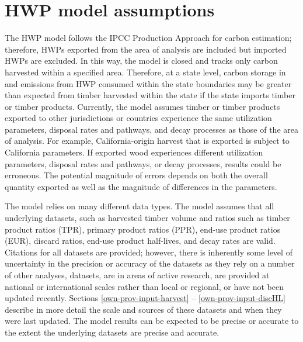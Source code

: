\documentclass[
  openany]{book}
\begin{document}
\hypertarget{int-assump}{%
\section{HWP model assumptions}\label{int-assump}}

The HWP model follows the IPCC Production Approach for carbon estimation; therefore, HWPs exported from the area of analysis are included but imported HWPs are excluded. In this way, the model is closed and tracks only carbon harvested within a specified area. Therefore, at a state level, carbon storage in and emissions from HWP consumed within the state boundaries may be greater than expected from timber harvested within the state if the state imports timber or timber products. Currently, the model assumes timber or timber products exported to other jurisdictions or countries experience the same utilization parameters, disposal rates and pathways, and decay processes as those of the area of analysis. For example, California-origin harvest that is exported is subject to California parameters. If exported wood experiences different utilization parameters, disposal rates and pathways, or decay processes, results could be erroneous. The potential magnitude of errors depends on both the overall quantity exported as well as the magnitude of differences in the parameters.

The model relies on many different data types. The model assumes that all underlying datasets, such as harvested timber volume and ratios such as timber product ratios (TPR), primary product ratios (PPR), end-use product ratios (EUR), discard ratios, end-use product half-lives, and decay rates are valid. Citations for all datasets are provided; however, there is inherently some level of uncertainty in the precision or accuracy of the datasets as they rely on a number of other analyses, datasets, are in areas of active research, are provided at national or international scales rather than local or regional, or have not been updated recently. Sections \ref{own-prov-input-harvest} -- \ref{own-prov-input-discHL} describe in more detail the scale and sources of these datasets and when they were last updated. The model results can be expected to be precise or accurate to the extent the underlying datasets are precise and accurate.
\end{document}
